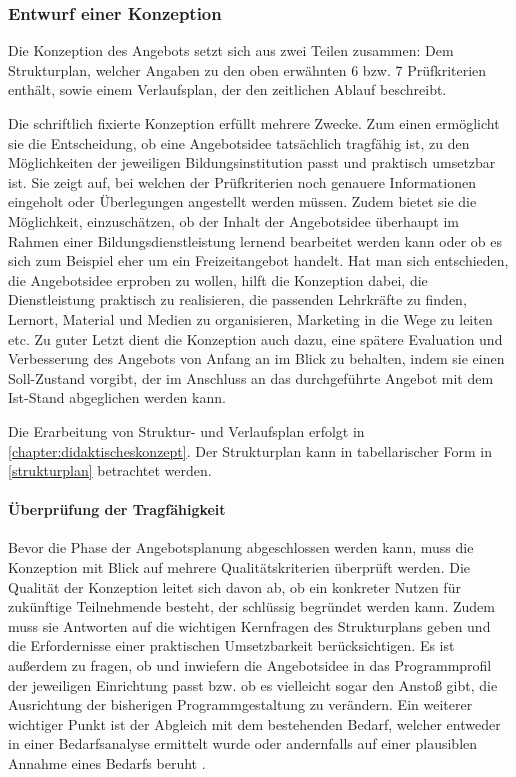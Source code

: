 \documentclass[
  twoside,
  parskip=half-,
  paper=176mm:246mm,
  BCOR=14mm,
  DIV=14,
]{scrreprt}
\begin{document}
\subsubsection{Entwurf einer Konzeption}

Die Konzeption des Angebots setzt sich aus zwei Teilen zusammen: Dem Strukturplan, welcher Angaben zu den oben erwähnten 6 bzw. 7 Prüfkriterien enthält, sowie einem Verlaufsplan, der den zeitlichen Ablauf beschreibt. \autocite[vgl.][91f.]{schlutz}

Die schriftlich fixierte Konzeption erfüllt mehrere Zwecke. Zum einen ermöglicht sie die Entscheidung, ob eine Angebotsidee tatsächlich tragfähig ist, zu den Möglichkeiten der jeweiligen Bildungsinstitution passt und praktisch umsetzbar ist. Sie zeigt auf, bei welchen der Prüfkriterien noch genauere Informationen eingeholt oder Überlegungen angestellt werden müssen. Zudem bietet sie die Möglichkeit, einzuschätzen, ob der Inhalt der Angebotsidee überhaupt im Rahmen einer Bildungsdienstleistung lernend bearbeitet werden kann oder ob es sich zum Beispiel eher um ein Freizeitangebot handelt. Hat man sich entschieden, die Angebotsidee erproben zu wollen, hilft die Konzeption dabei, die Dienstleistung praktisch zu realisieren, die passenden Lehrkräfte zu finden, Lernort, Material und Medien zu organisieren, Marketing in die Wege zu leiten etc. Zu guter Letzt dient die Konzeption auch dazu, eine spätere Evaluation und Verbesserung des Angebots von Anfang an im Blick zu behalten, indem sie einen Soll-Zustand vorgibt, der im Anschluss an das durchgeführte Angebot mit dem Ist-Stand abgeglichen werden kann.

\begin{praxis}
  Die Erarbeitung von Struktur- und Verlaufsplan erfolgt in \autoref{chapter:didaktischeskonzept}. Der Strukturplan kann in tabellarischer Form in \autoref{strukturplan} betrachtet werden. 
\end{praxis}

\paragraph{Überprüfung der Tragfähigkeit}

Bevor die Phase der Angebotsplanung abgeschlossen werden kann, muss die Konzeption mit Blick auf mehrere Qualitätskriterien überprüft werden. Die Qualität der Konzeption leitet sich davon ab, ob ein konkreter Nutzen für zukünftige Teilnehmende besteht, der schlüssig begründet werden kann. Zudem muss sie Antworten auf die wichtigen Kernfragen des Strukturplans geben und die Erfordernisse einer praktischen Umsetzbarkeit berücksichtigen. Es ist außerdem zu fragen, ob und inwiefern die Angebotsidee in das Programmprofil der jeweiligen Einrichtung passt bzw. ob es vielleicht sogar den Anstoß gibt, die Ausrichtung der bisherigen Programmgestaltung zu verändern. Ein weiterer wichtiger Punkt ist der Abgleich mit dem bestehenden Bedarf, welcher entweder in einer Bedarfsanalyse ermittelt wurde oder andernfalls auf einer plausiblen Annahme eines Bedarfs beruht \autocite[vgl.][105ff.]{schlutz}.
\end{document}
